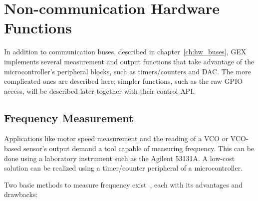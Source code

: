 \chapter{Non-communication Hardware Functions}

In addition to communication buses, described in chapter~\ref{ch:hw_buses}, GEX implements several measurement and output functions that take advantage of the microcontroller's peripheral blocks, such as timers/counters and \gls{DAC}. The more complicated ones are described here; simpler functions, such as the raw \gls{GPIO} access, will be described later together with their control \gls{API}.

\section{Frequency Measurement} \label{sec:theory-fcap}

Applications like motor speed measurement and the reading of a \gls{VCO} or \gls{VCO}-based sensor's output demand a tool capable of measuring frequency. This can be done using a laboratory instrument such as the Agilent 53131A. A low-cost solution can be realized using a timer/counter peripheral of a microcontroller.

\noindent
Two basic methods to measure frequency exist~\cite{fcap-twotypes}, each with its advantages and drawbacks:

